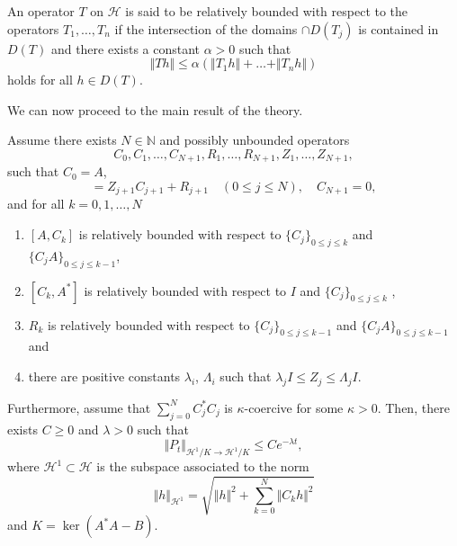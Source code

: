 \begin{definition}
	An operator $T$ on $\mathcal{H}$ is said to be relatively bounded
	with respect to the operators $T_{1},\ldots,T_{n}$ if the intersection
	of the domains $\cap D(T_{j})$ is contained in $D(T)$ and there
	exists a constant $\alpha>0$ such that 
	\[
	\Vert Th\Vert\le\alpha(\Vert T_{1}h\Vert+\ldots+\Vert T_{n}h\Vert)
	\]
	holds for all $h\in D(T)$. 
\end{definition}
We can now proceed to the main result of the theory.
\begin{theorem}{\cite[Theorem 24]{villani2009hypocoercivity}}
	\label{thm: hypocoercivity abstract}Assume there exists $N\in\mathbb{N}$
	and possibly unbounded operators $$C_{0},C_{1},\ldots,C_{N+1},R_{1},\ldots,R_{N+1},Z_{1},\ldots,Z_{N+1},$$
	such that $C_{0}=A$, 
	\begin{equation}
	[C_{j},B]=Z_{j+1}C_{j+1}+R_{j+1}\quad(0\le j\le N),\quad C_{N+1}=0,\label{eq:iterated commutators}
	\end{equation}
	and for all $k=0,1,\ldots,N$ 
	\begin{enumerate}[label=(\alph*)]
		\item \label{it:hypo1} $[A,C_{k}]$ is relatively bounded with respect to $\{C_{j}\}_{0\le j\le k}$
		and $\{C_{j}A\}_{0\le j\le k-1}$, 
		\item \label{it:hypo2} $[C_{k},A^{*}]$ is relatively bounded with respect to $I$ and $\{C_{j}\}_{0\le j\le k}$
		,
		\item \label{it:hypo3} $R_{k}$ is relatively bounded with respect to $\{C_{j}\}_{0\le j\le k-1}$
		and $\{C_{j}A\}_{0\le j\le k-1}$ and
		\item \label{it:hypo4} there are positive constants $\lambda_{i}$, $\Lambda_{i}$ such that
		$\lambda_{j}I\le Z_{j}\le\Lambda_{j}I$.
	\end{enumerate}
	Furthermore, assume that $\sum_{j=0}^{N}C_{j}^{*}C_{j}$ is $\kappa$-coercive
	for some $\kappa>0$.  Then, there exists $C\ge0$ and $\lambda>0$ such that 
	\begin{equation}
	\Vert P_t\Vert_{\mathcal{H}^{1}/K\rightarrow \mathcal{H}^{1}/K}\le Ce^{-\lambda t},\label{eq:hypocoercivity estimate}
	\end{equation}
	where $\mathcal{H}^{1}\subset\mathcal{H}$ is the subspace associated
	to the norm
	\begin{equation}
	\label{eq:abstractH1_norm}
	\Vert h\Vert_{\mathcal{H}^{1}}=\sqrt{\Vert h\Vert^{2}+\sum_{k=0}^{N}\Vert C_{k}h\Vert^{2}}
	\end{equation}
	and $K=\ker(A^{*}A-B)$. \end{theorem}
